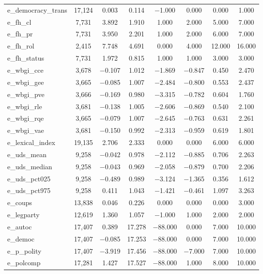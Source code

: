 \begin{table}[!htbp]
\begin{tabular}{@{\extracolsep{5pt}}lccccccc}
e\_democracy\_trans & 17,124 & 0.003 & 0.114 & $-$1.000 & 0.000 & 0.000 & 1.000 \\ 
e\_fh\_cl & 7,731 & 3.892 & 1.910 & 1.000 & 2.000 & 5.000 & 7.000 \\ 
e\_fh\_pr & 7,731 & 3.950 & 2.201 & 1.000 & 2.000 & 6.000 & 7.000 \\ 
e\_fh\_rol & 2,415 & 7.748 & 4.691 & 0.000 & 4.000 & 12.000 & 16.000 \\ 
e\_fh\_status & 7,731 & 1.972 & 0.815 & 1.000 & 1.000 & 3.000 & 3.000 \\ 
e\_wbgi\_cce & 3,678 & $-$0.107 & 1.012 & $-$1.869 & $-$0.847 & 0.450 & 2.470 \\ 
e\_wbgi\_gee & 3,665 & $-$0.085 & 1.007 & $-$2.484 & $-$0.800 & 0.553 & 2.437 \\ 
e\_wbgi\_pve & 3,666 & $-$0.169 & 0.980 & $-$3.315 & $-$0.782 & 0.604 & 1.760 \\ 
e\_wbgi\_rle & 3,681 & $-$0.138 & 1.005 & $-$2.606 & $-$0.869 & 0.540 & 2.100 \\ 
e\_wbgi\_rqe & 3,665 & $-$0.079 & 1.007 & $-$2.645 & $-$0.763 & 0.631 & 2.261 \\ 
e\_wbgi\_vae & 3,681 & $-$0.150 & 0.992 & $-$2.313 & $-$0.959 & 0.619 & 1.801 \\ 
e\_lexical\_index & 19,135 & 2.706 & 2.333 & 0.000 & 0.000 & 6.000 & 6.000 \\ 
e\_uds\_mean & 9,258 & $-$0.042 & 0.978 & $-$2.112 & $-$0.885 & 0.706 & 2.263 \\ 
e\_uds\_median & 9,258 & $-$0.043 & 0.969 & $-$2.058 & $-$0.879 & 0.700 & 2.206 \\ 
e\_uds\_pct025 & 9,258 & $-$0.489 & 0.989 & $-$3.124 & $-$1.365 & 0.356 & 1.612 \\ 
e\_uds\_pct975 & 9,258 & 0.411 & 1.043 & $-$1.421 & $-$0.461 & 1.097 & 3.263 \\ 
e\_coups & 13,838 & 0.046 & 0.226 & 0.000 & 0.000 & 0.000 & 3.000 \\ 
e\_legparty & 12,619 & 1.360 & 1.057 & $-$1.000 & 1.000 & 2.000 & 2.000 \\ 
e\_autoc & 17,407 & 0.389 & 17.278 & $-$88.000 & 0.000 & 7.000 & 10.000 \\ 
e\_democ & 17,407 & $-$0.085 & 17.253 & $-$88.000 & 0.000 & 7.000 & 10.000 \\ 
e\_p\_polity & 17,407 & $-$3.919 & 17.456 & $-$88.000 & $-$7.000 & 7.000 & 10.000 \\ 
e\_polcomp & 17,281 & 1.427 & 17.527 & $-$88.000 & 1.000 & 8.000 & 10.000 \\ 

\end{tabular}
\end{table}

